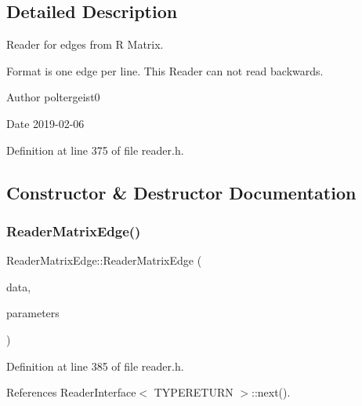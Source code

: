 \subsection{Detailed Description}
Reader for edges from R Matrix. 

Format is one edge per line. This Reader can not read backwards.

\begin{DoxyAuthor}{Author}
poltergeist0
\end{DoxyAuthor}
\begin{DoxyDate}{Date}
2019-\/02-\/06 
\end{DoxyDate}


Definition at line 375 of file reader.\+h.



\subsection{Constructor \& Destructor Documentation}
\mbox{\label{classReaderMatrixEdge_a8bb3d1f9b91410abcfc2bc1c3becea5c}} 
\subsubsection{\texorpdfstring{Reader\+Matrix\+Edge()}{ReaderMatrixEdge()}}
{\footnotesize\ttfamily Reader\+Matrix\+Edge\+::\+Reader\+Matrix\+Edge (\begin{DoxyParamCaption}\item[{const Rcpp\+::\+Numeric\+Matrix \&}]{data,  }\item[{const \hyperlink{structProgramParameters}{Program\+Parameters} \&}]{parameters }\end{DoxyParamCaption})\hspace{0.3cm}{\ttfamily [inline]}}



Definition at line 385 of file reader.\+h.



References Reader\+Interface$<$ T\+Y\+P\+E\+R\+E\+T\+U\+R\+N $>$\+::next().

